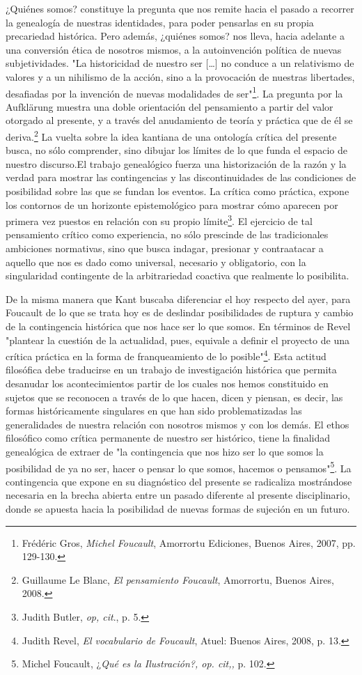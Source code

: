 \documentclass{book}
\begin{document}
¿Quiénes somos? constituye la pregunta que nos remite hacia el pasado a
recorrer la genealogía de nuestras identidades, para poder pensarlas en
su propia precariedad histórica. Pero además, ¿quiénes somos? nos lleva,
hacia adelante a una conversión ética de nosotros mismos, a la
autoinvención política de nuevas subjetividades. "La historicidad de
nuestro ser {[}\ldots{]} no conduce a un relativismo de valores y a un
nihilismo de la acción, sino a la provocación de nuestras libertades,
desafiadas por la invención de nuevas modalidades de ser"\footnote{Frédéric
  Gros, \emph{Michel Foucault}, Amorrortu Ediciones, Buenos Aires, 2007,
  pp. 129-130.}. La pregunta por la Aufklärung muestra una doble
orientación del pensamiento a partir del valor otorgado al presente, y a
través del anudamiento de teoría y práctica que de él se
deriva.\footnote{Guillaume Le Blanc, \emph{El pensamiento Foucault},
  Amorrortu, Buenos Aires, 2008.} La vuelta sobre la idea kantiana de
una ontología crítica del presente busca, no sólo comprender, sino
dibujar los límites de lo que funda el espacio de nuestro discurso.El
trabajo genealógico fuerza una historización de la razón y la verdad
para mostrar las contingencias y las discontinuidades de las condiciones
de posibilidad sobre las que se fundan los eventos. La crítica como
práctica, expone los contornos de un horizonte epistemológico para
mostrar cómo aparecen por primera vez puestos en relación con su propio
límite\footnote{Judith Butler, \emph{op, cit}., p. 5.}. El ejercicio de
tal pensamiento crítico como experiencia, no sólo prescinde de las
tradicionales ambiciones normativas, sino que busca indagar, presionar y
contraatacar a aquello que nos es dado como universal, necesario y
obligatorio, con la singularidad contingente de la arbitrariedad
coactiva que realmente lo posibilita.

De la misma manera que Kant buscaba diferenciar el hoy respecto del
ayer, para Foucault de lo que se trata hoy es de deslindar posibilidades
de ruptura y cambio de la contingencia histórica que nos hace ser lo que
somos. En términos de Revel "plantear la cuestión de la actualidad,
pues, equivale a definir el proyecto de una crítica práctica en la forma
de franqueamiento de lo posible"\footnote{Judith Revel, \emph{El
  vocabulario de Foucault}, Atuel: Buenos Aires, 2008, p. 13.}. Esta
actitud filosófica debe traducirse en un trabajo de investigación
histórica que permita desanudar los acontecimientos partir de los cuales
nos hemos constituido en sujetos que se reconocen a través de lo que
hacen, dicen y piensan, es decir, las formas históricamente singulares
en que han sido problematizadas las generalidades de nuestra relación
con nosotros mismos y con los demás. El ethos filosófico como crítica
permanente de nuestro ser histórico, tiene la finalidad genealógica de
extraer de "la contingencia que nos hizo ser lo que somos la posibilidad
de ya no ser, hacer o pensar lo que somos, hacemos o
pensamos"\footnote{Michel Foucault, ¿\emph{Qué es la Ilustración?, op.
  cit,,} p. 102.}. La contingencia que expone en su diagnóstico del
presente se radicaliza mostrándose necesaria en la brecha abierta entre
un pasado diferente al presente disciplinario, donde se apuesta hacia la
posibilidad de nuevas formas de sujeción en un futuro.
\end{document}
